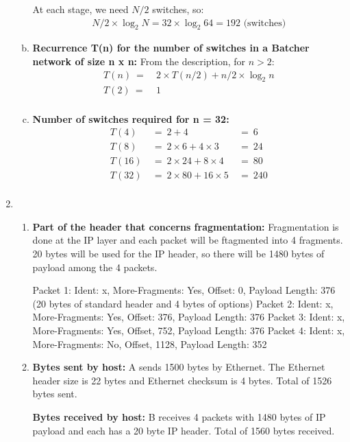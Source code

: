 \documentclass[11pt]{article}
\begin{document}
\begin{enumerate}[1.]
\begin{enumerate}[(a)]
    At each stage, we need $N/2$ switches, so:
    \begin{align*}
      N/2 \times \log_2 N = 32 \times \log_2 64 = 192 \text{ (switches)}
    \end{align*}
  \item
    \textbf{
      Recurrence T(n) for the number of switches in a Batcher 
      network of size n x n:
    }
    From the description, for $n > 2$:
    \begin{align*}
      T(n)\ =&\ 2 \times T(n/2) + n/2 \times \log_2 n \\
      T(2)\ =&\ 1 \\
    \end{align*}
  \item
    \textbf{
      Number of switches required for n = 32:
    }
    \begin{align*}
      T(4)\ &=\ 2 + 4 \ &=\ 6 \\
      T(8)\ &=\ 2 \times 6 + 4 \times 3 \ &=\ 24 \\
      T(16)\ &=\ 2 \times 24 + 8 \times 4 \ &=\ 80 \\
      T(32)\ &=\ 2 \times 80 + 16 \times 5 \ &=\ 240 \\      
    \end{align*}
  \end{enumerate}
\item %
  \begin{enumerate}
  \item
    \textbf{
      Part of the header that concerns fragmentation:
    }
    Fragmentation is done at the IP layer and each packet will be ftagmented into 4 fragments. 20 bytes will be used for the IP header, so there will be 1480 bytes of payload among the 4 packets.

    Packet 1: Ident: x,  More-Fragments: Yes, Offset: 0, Payload Length: 376
    (20 bytes of standard header and 4 bytes of options)
    Packet 2: Ident: x, More-Fragments: Yes, Offset: 376, Payload Length: 376
    Packet 3: Ident: x, More-Fragments: Yes, Offset, 752, Payload Length: 376
    Packet 4: Ident: x, More-Fragments: No, Offset, 1128, Payload Length: 352
  \item 
    \textbf{
      Bytes sent by host:
    }
    A sends 1500 bytes by Ethernet. The Ethernet header size is 22 bytes and Ethernet checksum is 4 bytes. Total of 1526 bytes sent.

    \textbf{
      Bytes received by host:
    }
    B receives 4 packets with 1480 bytes of IP payload and each has a 20 byte IP header. Total of 1560 bytes received.


\end{enumerate}
\end{enumerate}
\end{document}
